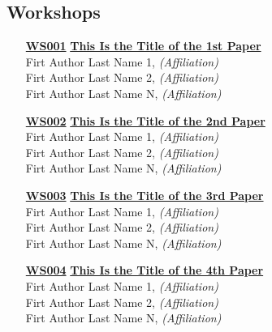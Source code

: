 \subsection{Workshops}
\begin{enumerate}
\item[\href{https://doi.org/10.1145/1122445.1122456}{\textbf{WS001}}]
\href{https://doi.org/10.1145/1122445.1122456}{\textbf{This Is the Title of the 1st Paper}}\\
Firt Author Last Name 1, \emph{(Affiliation)}\\
Firt Author Last Name 2, \emph{(Affiliation)}\\
Firt Author Last Name N, \emph{(Affiliation)}\\

\item[\href{https://doi.org/10.1145/1122445.1122456}{\textbf{WS002}}]
\href{https://doi.org/10.1145/1122445.1122456}{\textbf{This Is the Title of the 2nd Paper}}\\
Firt Author Last Name 1, \emph{(Affiliation)}\\
Firt Author Last Name 2, \emph{(Affiliation)}\\
Firt Author Last Name N, \emph{(Affiliation)}\\

\item[\href{https://doi.org/10.1145/1122445.1122456}{\textbf{WS003}}]
\href{https://doi.org/10.1145/1122445.1122456}{\textbf{This Is the Title of the 3rd Paper}}\\
Firt Author Last Name 1, \emph{(Affiliation)}\\
Firt Author Last Name 2, \emph{(Affiliation)}\\
Firt Author Last Name N, \emph{(Affiliation)}\\

\item[\href{https://doi.org/10.1145/1122445.1122456}{\textbf{WS004}}]
\href{https://doi.org/10.1145/1122445.1122456}{\textbf{This Is the Title of the 4th Paper}}\\
Firt Author Last Name 1, \emph{(Affiliation)}\\
Firt Author Last Name 2, \emph{(Affiliation)}\\
Firt Author Last Name N, \emph{(Affiliation)}\\
\end{enumerate}